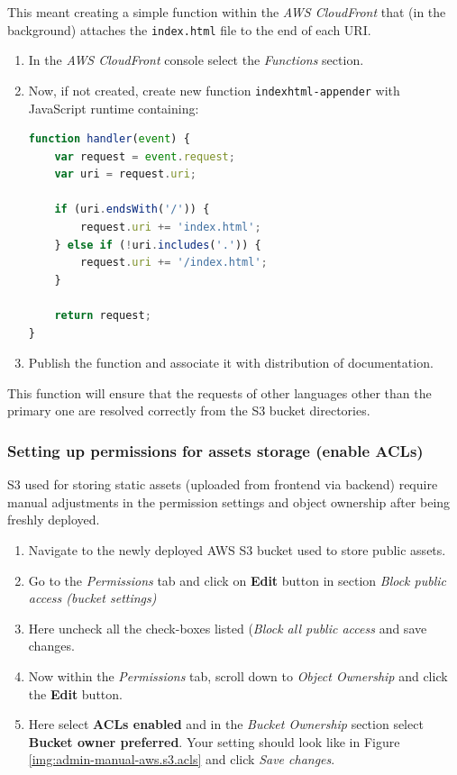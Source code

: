 This meant creating a simple function within the \textit{AWS CloudFront} that (in the background) attaches the \texttt{index.html} file to the end of each URI.

\begin{enumerate}
    \item In the \textit{AWS CloudFront} console select the \textit{Functions} section.
    \item Now, if not created, create new function \texttt{indexhtml-appender} with JavaScript runtime containing:
\begin{lstlisting}[language=javascript,caption={AWS CloudFront function to  append \texttt{index.html} to each URI}]
function handler(event) {
    var request = event.request;
    var uri = request.uri;

    if (uri.endsWith('/')) {
        request.uri += 'index.html';
    } else if (!uri.includes('.')) {
        request.uri += '/index.html';
    }

    return request;
}
\end{lstlisting}
\item Publish the function and associate it with distribution of documentation.
\end{enumerate}

This function will ensure that the requests of other languages other than the primary one are resolved correctly from the \ac{S3} bucket directories.

\subsubsection{Setting up permissions for assets storage (enable ACLs)}
\label{attachments:admin-manual-aws.s3.permissions}
\ac{S3} used for storing static assets (uploaded from frontend via backend) require manual adjustments in the permission settings and object ownership after being freshly deployed.

\begin{enumerate}
    \item Navigate to the newly deployed AWS \ac{S3} bucket used to store public assets.
    \item Go to the \textit{Permissions} tab and click on \textbf{Edit} button in section \textit{Block public access (bucket settings)}
    \item Here uncheck all the check-boxes listed (\textit{Block all public access} and save changes.
    \item Now within the \textit{Permissions} tab, scroll down to \textit{Object Ownership} and click the \textbf{Edit} button. 
    \item Here select \textbf{ACLs enabled} and in the \textit{Bucket Ownership} section select \textbf{Bucket owner preferred}. Your setting should look like in Figure \ref{img:admin-manual-aws.s3.acls} and click \textit{Save changes}.
\end{enumerate}


